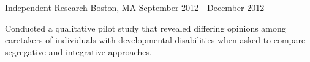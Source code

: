 \begin{cventries}
    {Independent Research}
    {Boston, MA}
    {September 2012 - December 2012}
    {\begin{cvitems}
        \item{Conducted a qualitative 
            {pilot study} that revealed differing opinions among caretakers of
            individuals with developmental disabilities when asked to compare
            segregative and integrative approaches.}
    \end{cvitems}}
    \vspace*{0.2cm}

\end{cventries}
